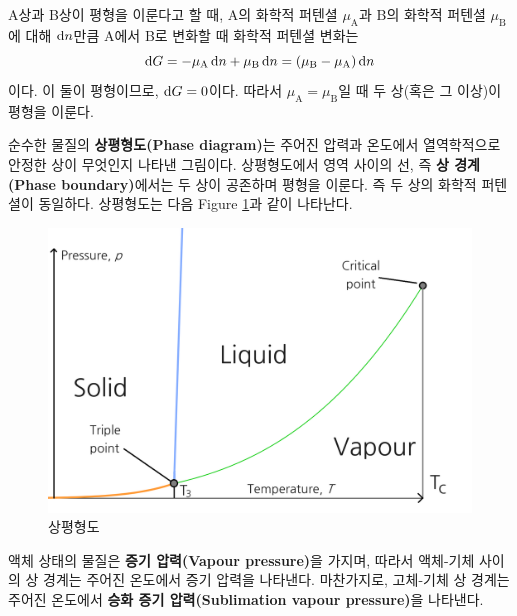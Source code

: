        A상과 B상이 평형을 이룬다고 할 때, A의 화학적 퍼텐셜 $\mu_\mathrm{A}$과 B의 화학적 퍼텐셜 $\mu_\mathrm{B}$에 대해 
        $\operatorname{d\!} n$만큼 A에서 B로 변화할 때 화학적 퍼텐셜 변화는
        \begin{equation*}
            \operatorname{d\!} G = -\mu_\mathrm{A} \operatorname{d\!} n + \mu_\mathrm{B} \operatorname{d\!} n = \left(\mu_\mathrm{B} - \mu_\mathrm{A}\right) \operatorname{d\!} n
        \end{equation*}
        이다. 이 둘이 평형이므로, $\operatorname{d\!} G = 0$이다. 따라서 $\mu_\mathrm{A} = \mu_\mathrm{B}$일 때 두 상(혹은 그 이상)이 평형을 
        이룬다.
        \par 순수한 물질의 \textbf{상평형도(Phase diagram)}는 주어진 압력과 온도에서 열역학적으로 안정한 상이 무엇인지 나타낸 그림이다. 
        상평형도에서 영역 사이의 선, 즉 \textbf{상 경계(Phase boundary)}에서는 두 상이 공존하며 평형을 이룬다. 즉 두 상의 화학적 퍼텐셜이 
        동일하다. 상평형도는 다음 Figure \ref{f5}과 같이 나타난다.
        \begin{figure}[H]
            \centering
            \includegraphics[scale=0.4]{Images/PhaseDiag1}
            \caption{상평형도}\label{f5}
        \end{figure}
        액체 상태의 물질은 \textbf{증기 압력(Vapour pressure)}을 가지며, 따라서 액체-기체 사이의 상 경계는 주어진 온도에서 증기 압력을 나타낸다. 
        마찬가지로, 고체-기체 상 경계는 주어진 온도에서 \textbf{승화 증기 압력(Sublimation vapour pressure)}을 나타낸다.
